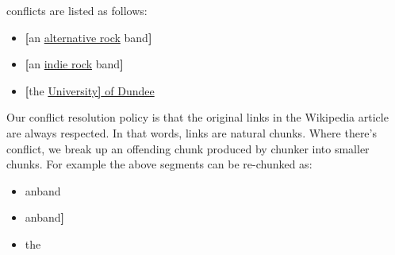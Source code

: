 conflicts are listed as follows:
\begin{itemize}
\item {\textbf{[}an {\color{blue}\uline{alternative rock}} band\textbf{]}}
\item {\textbf{[}an {\color{blue}\uline{indie rock}} band\textbf{]}}
\item {\textbf{[}the {\color{blue}\uline{University{\color{black}\textbf{]}}
of \lbb Dundee}\rbb}}
\end{itemize}

Our conflict resolution policy is that the original links in the
Wikipedia article are always respected. In that words,
links are natural chunks. Where there's conflict,
we break up an offending chunk produced by chunker into smaller chunks.
For example the above segments can be re-chunked as:

\begin{itemize}
\item {\lbb an\rbb {}\rbb \lbb band\rbb}
\item {\lbb an\rbb {}\rbb \lbb band\textbf{]}}
\item {\lbb the\rbb {}\rbb}
\end{itemize}



